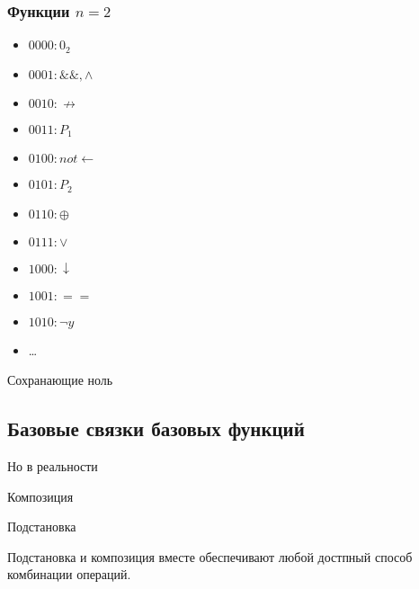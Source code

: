 \documentclass[a4paper, 12pt]{article}
\begin{document}
    \subsubsection{Функции $n = 2$}
    \begin{itemize}
        \item $0000: 0_2$
        \item $0001: \&\&, \land$
        \item $0010: \not \rightarrow$
        \item $0011: P_1$
        \item $0100: not \leftarrow$
        \item $0101: P_2$
        \item $0110: \oplus$
        \item $0111: \vee$
        \item $1000: \downarrow$
        \item $1001: ==$
        \item $1010: \lnot y$
        \item \dots %
    \end{itemize}


    \begin{definition}
        Сохранающие ноль
    \end{definition}


    \subsection{Базовые связки базовых функций}

    Но в реальности 

    \begin{definition}
        Композиция
    \end{definition}

    \begin{definition}
        Подстановка
    \end{definition}

    Подстановка и композиция вместе обеспечивают любой достпный способ комбинации операций.
    
\end{document}
